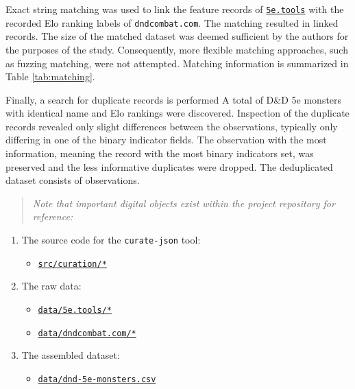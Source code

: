 \documentclass{article}
\providecommand{\tightlist}{%
	\setlength{\itemsep}{0pt}\setlength{\parskip}{0pt}}
\newcommand{\Qty}[1]{\oldstylenums{#1}}
\newcommand{\DnD}{D\&D 5e\xspace}
\newcommand{\FiveETools}{\href{https://5etools-mirror-1.github.io/}{\texttt{5e.tools}}\xspace}
\newcommand{\DnDCombat}{\texttt{dndcombat.com}\xspace}
\begin{document}
Exact string matching was used to link the feature records of \FiveETools with the recorded Elo ranking labels of \DnDCombat.
The matching resulted in \Qty{1,630} linked records.
The size of the matched dataset was deemed sufficient by the authors for the purposes of the study.
Consequently, more flexible matching approaches, such as fuzzing matching, were not attempted.
Matching information is summarized in Table \ref{tab:matching}.


Finally, a search for duplicate records is performed
A total of \Qty{248} \DnD monsters with identical name and Elo rankings were discovered.
Inspection of the duplicate records revealed only slight differences between the observations, typically only differing in one of the binary indicator fields.
The observation with the most information, meaning the record with the most binary indicators set, was preserved and the less informative duplicates were dropped.
The deduplicated dataset consists of \Qty{1,382} observations.

\begin{quote}
\emph{Note that important digital objects exist within the project repository for reference:}%
\end{quote}

\begin{enumerate}

\item 
The source code for the \texttt{curate-json} tool:

\begin{itemize}
	\tightlist
	\item
	\href{https://github.com/recursion-ninja/CSc-74020/tree/master/src/curation}{\texttt{src/curation/*}}
\end{itemize}

\item
The raw data:

\begin{itemize}
	\tightlist
	\item
	\href{https://github.com/recursion-ninja/CSc-74020/tree/master/data/5e.tools}{\texttt{data/5e.tools/*}
	}
	\item
	\href{https://github.com/recursion-ninja/CSc-74020/tree/master/data/dndcombat.com}{\texttt{data/dndcombat.com/*}}
\end{itemize}

\item
The assembled dataset:

\begin{itemize}
	\tightlist
	\item
	\href{https://github.com/recursion-ninja/CSc-74020/tree/master/data/dnd-5e-monsters.csv}{\texttt{data/dnd-5e-monsters.csv}}
\end{itemize}

\end{enumerate}
\end{document}
